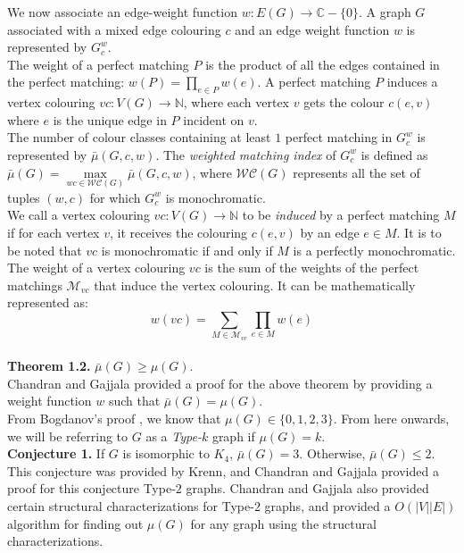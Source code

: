 \documentclass[11pt]{article}
\begin{document}
We now associate an edge-weight function $w:E(G) \to \mathbb{C}-\{0\}$. A graph $G$ associated with a mixed edge colouring $c$ and an edge weight function $w$ is represented by $G_c^{w}$.\\
The weight of a perfect matching $P$ is the product of all the edges contained in the perfect matching: $w(P)=\prod\limits_{e \in P} w(e)$. A perfect matching $P$ induces a vertex colouring $vc:V(G) \to \mathbb{N}$, where each vertex $v$ gets the colour $c(e,v)$ where $e$ is the unique edge in $P$ incident on $v$.\\
The number of colour classes containing at least $1$ perfect matching in $G_c^{w}$ is represented by $\bar\mu(G,c,w)$. The \textit{weighted matching index} of $G_c^{w}$ is defined as $\bar\mu(G)=\max\limits_{wc \in \mathcal{WC}(G)} \bar\mu(G,c,w)$, where $\mathcal{WC}(G)$ represents all the set of tuples $(w,c)$ for which $G_c^{w}$ is monochromatic.\\
We call a vertex colouring $vc:V(G) \to \mathbb{N}$ to be \textit{induced} by a perfect matching $M$ if for each vertex $v$, it receives the colouring $c(e,v)$ by an edge $e \in M$. It is to be noted that $vc$ is monochromatic if and only if $M$ is a perfectly monochromatic. The weight of a vertex colouring $vc$ is the sum of the weights of the perfect matchings $\mathcal{M}_{vc}$ that induce the vertex colouring. It can be mathematically represented as:\\
$$w(vc)=\sum\limits_{M \in \mathcal{M}_{vc}} \prod\limits_{e \in M} w(e)$$\medskip\\
\textbf{Theorem 1.2.} $\bar\mu(G) \ge \mu(G)$.\\
Chandran and Gajjala\cite{chandran_gajjala1000} provided a proof for the above theorem by providing a weight function $w$ such that $\bar\mu(G)=\mu(G)$.\medskip\\
From Bogdanov's proof \cite{bogdanov}, we know that $\mu(G)\in\{0,1,2,3\}$. From here onwards, we will be referring to $G$ as a \textit{Type-$k$} graph if $\mu(G)=k$.\\
\textbf{Conjecture 1.} If $G$ is isomorphic to $K_4$, $\bar\mu(G)=3$. Otherwise, $\bar\mu(G) \le 2$.\\
This conjecture was provided by Krenn\cite{Krenn_website}, and Chandran and Gajjala\cite{chandran_gajjala1000} provided a proof for this conjecture Type-$2$ graphs. Chandran and Gajjala\cite{chandran_gajjala1000} also provided certain structural characterizations for Type-$2$ graphs, and provided a $O(|V||E|)$ algorithm for finding out $\mu(G)$ for any graph using the structural characterizations.\medskip\\
\end{document}
